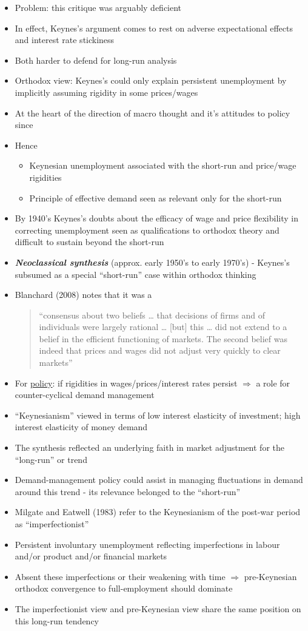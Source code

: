 \documentclass{article}
\begin{document}
\begin{itemize}
			\item Problem: this critique was arguably deficient
			\item In effect, Keynes's argument comes to rest on adverse expectational effects and interest rate stickiness
			\item Both harder to defend for long-run analysis
			\item Orthodox view: Keynes's could only explain persistent unemployment by implicitly assuming rigidity in some prices/wages
			\item At the heart of the direction of macro thought and it's attitudes to policy since 
			\item Hence
			\begin{itemize}
				\item Keynesian unemployment associated with the short-run and price/wage rigidities 
				\item Principle of effective demand seen as relevant only for the short-run
			\end{itemize}
		\item By 1940's Keynes's doubts about the efficacy of wage and price flexibility in correcting unemployment seen as qualifications to orthodox theory and difficult to sustain beyond the short-run
		\item \textbf{\textit{Neoclassical synthesis}} (approx. early 1950's to early 1970's) -  Keynes's subsumed as a special ``short-run'' case within orthodox thinking
		\item Blanchard (2008) notes that it was a
		\begin{quote}
			``consensus about two beliefs … that decisions of firms and of individuals were largely rational … [but] this … did not extend to a belief in the efficient functioning of markets. The second belief was indeed that prices and wages did not adjust very quickly to clear markets''
		\end{quote}
		\item For \underline{policy}: if rigidities in wages/prices/interest rates persist \( \Rightarrow \) a role for counter-cyclical demand management
		\item ``Keynesianism'' viewed in terms of low interest elasticity of investment; high interest elasticity of money demand
		\item The synthesis reflected an underlying faith in market adjustment for the “long-run'' or trend
		\item Demand-management policy could assist in managing fluctuations in demand around this trend - its relevance belonged to the “short-run''
		\item Milgate and Eatwell (1983) refer to the Keynesianism of the post-war period as ``imperfectionist''
		\item Persistent involuntary unemployment reflecting imperfections in labour and/or product and/or financial markets
		\item Absent these imperfections or their weakening with time \( \Rightarrow \) pre-Keynesian orthodox convergence to full-employment should dominate
		\item The imperfectionist view and pre-Keynesian view share the same position on this long-run tendency
	\end{itemize}
\end{document}
